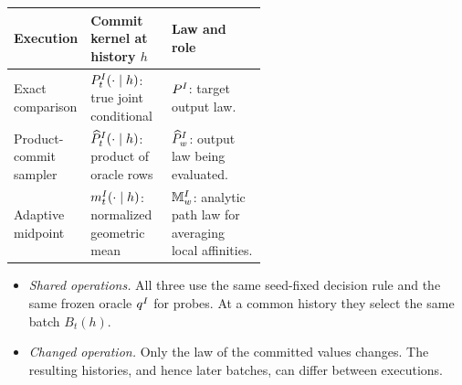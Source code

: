 \begin{center}
\small
\begin{tabularx}{\linewidth}{@{}>{\raggedright\arraybackslash}p{0.23\linewidth}
  >{\raggedright\arraybackslash}p{0.32\linewidth}
  >{\raggedright\arraybackslash}X@{}}
\toprule
Execution & Commit kernel at history \(h\) & Law and role \\
\midrule
Exact comparison
& \(\HardExactBatchLaw{t}{I}(\cdot\mid h)\): true joint conditional
& \(\HardTargetLaw{I}\): target output law. \\
\addlinespace
Product-commit sampler
& \(\HardProductBatchLaw{t}{I}(\cdot\mid h)\): product of oracle rows
& \(\HardOutputLaw{I}{w}\): output law being evaluated. \\
\addlinespace
Adaptive midpoint
& \(\HardMidpointKernel{t}{I}(\cdot\mid h)\): normalized geometric mean
& \(\HardMidpointLaw{I}{w}\): analytic path law for averaging local affinities. \\
\bottomrule
\end{tabularx}
\end{center}

\begin{itemize}
\item \emph{Shared operations.} All three use the same seed-fixed decision
rule and the same frozen oracle \(\HardOracle{I}\) for probes. At a common
history they select the same batch \(B_t(h)\).
\item \emph{Changed operation.} Only the law of the committed values changes.
The resulting histories, and hence later batches, can differ between executions.
\end{itemize}

